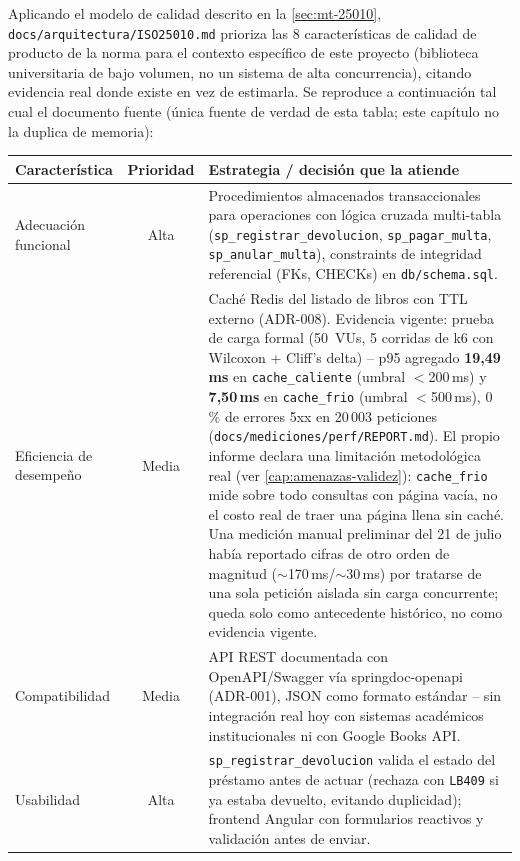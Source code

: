 Aplicando el modelo de calidad descrito en la \autoref{sec:mt-25010},
\texttt{docs/arquitectura/ISO25010.md} prioriza las 8 características de
calidad de producto de la norma para el contexto específico de este
proyecto (biblioteca universitaria de bajo volumen, no un sistema de
alta concurrencia), citando evidencia real donde existe en vez de
estimarla. Se reproduce a continuación tal cual el documento fuente
(única fuente de verdad de esta tabla; este capítulo no la duplica de
memoria):

\begin{center}
\small
\begin{longtable}{|l|c|p{8.7cm}|}
\hline
\rowcolor{verdeuteq}
\color{white}\textbf{Característica} & \color{white}\textbf{Prioridad} & \color{white}\textbf{Estrategia / decisión que la atiende} \\
\hline
\endhead
Adecuación funcional & Alta & Procedimientos almacenados transaccionales para operaciones con lógica cruzada multi-tabla (\texttt{sp\_registrar\_devolucion}, \texttt{sp\_pagar\_multa}, \texttt{sp\_anular\_multa}), constraints de integridad referencial (FKs, CHECKs) en \texttt{db/schema.sql}. \\
\hline
Eficiencia de desempeño & Media & Caché Redis del listado de libros con TTL externo (ADR-008). Evidencia vigente: prueba de carga formal (50~VUs, 5 corridas de k6 con Wilcoxon + Cliff's delta) -- p95 agregado \textbf{19{,}49\,ms} en \texttt{cache\_caliente} (umbral $<$200\,ms) y \textbf{7{,}50\,ms} en \texttt{cache\_frio} (umbral $<$500\,ms), 0\,\% de errores 5xx en 20\,003 peticiones (\texttt{docs/mediciones/perf/REPORT.md}). El propio informe declara una limitación metodológica real (ver \autoref{cap:amenazas-validez}): \texttt{cache\_frio} mide sobre todo consultas con página vacía, no el costo real de traer una página llena sin caché. Una medición manual preliminar del 21 de julio había reportado cifras de otro orden de magnitud ($\sim$170\,ms/$\sim$30\,ms) por tratarse de una sola petición aislada sin carga concurrente; queda solo como antecedente histórico, no como evidencia vigente. \\
\hline
Compatibilidad & Media & API REST documentada con OpenAPI/Swagger vía springdoc-openapi (ADR-001), JSON como formato estándar -- sin integración real hoy con sistemas académicos institucionales ni con Google Books API. \\
\hline
Usabilidad & Alta & \texttt{sp\_registrar\_devolucion} valida el estado del préstamo antes de actuar (rechaza con \texttt{LB409} si ya estaba devuelto, evitando duplicidad); frontend Angular con formularios reactivos y validación antes de enviar. \\

\end{longtable}
\end{center}
